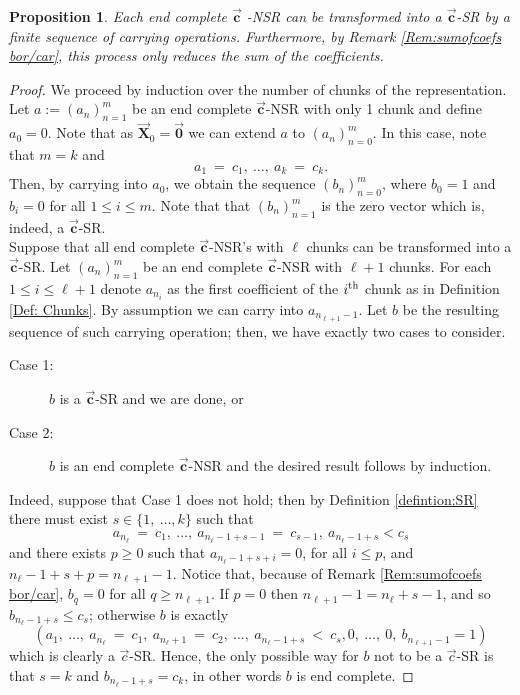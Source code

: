 \documentclass[]{interact}
\newcommand{\vtr}[1]{\vec{\mathbf{#1}}}
\theoremstyle{plain}
\numberwithin{equation}{section} %
\newtheorem{proposition}[thm]{Proposition}
\numberwithin{table}{section} %
\numberwithin{figure}{section}
\begin{document}
\begin{proposition}\label{prop:End complete}
    Each end complete $\vtr{c}$ -NSR can be transformed into a $\vtr{c}$-SR by a finite sequence of carrying operations. Furthermore, by Remark \textcolor{blue}{\ref{Rem:sumofcoefs bor/car}}, this process only reduces the sum of the coefficients.
\end{proposition}
\begin{proof}
     We proceed by induction over the number of chunks of the representation. Let $a:=(a_n)_{n=1}^m$ be an end complete $\vtr{c}$-NSR with only 1 chunk and define $a_0=0$. Note that as $\vtr{X}_0=\vtr{0}$ we can extend $a$ to $(a_n)_{n=0}^m$. In this case, note that $m = k$ and
    \[ 
      a_1\ =\ c_1 , \ \ldots ,\ a_k\ =\ c_k.
    \]
    Then, by carrying into $a_0$, we obtain the sequence $(b_n)_{n=0}^m$, where $b_0=1$ and $b_i=0$ for all $1\leq i\leq m$. Note that that $(b_n)_{n=1}^m$ is the zero vector which is, indeed, a $\vtr{c}$-SR.\\
    
    Suppose that all end complete $\vtr{c}$-NSR's with $\ell$ chunks can be transformed into a $\vtr{c}$-SR. Let $(a_n)_{n=1}^m$ be an end complete $\vtr{c}$-NSR with $\ell+1$ chunks. For each $1\leq i\leq \ell+1$ denote $a_{n_i}$ as the first coefficient of the $i^{\rm th}$ chunk as in Definition \textcolor{blue}{\ref{Def: Chunks}}. By assumption we can carry into $a_{n_{\ell+1} -1}$. Let $b$ be the resulting sequence of such carrying operation; then, we have exactly two cases to consider. 
            \begin{description}
                \item[Case 1:] $b$ is a $\vtr{c}$-SR and we are done, or\\
                
                \item[Case 2:] $b$ is an end complete $\vtr{c}$-NSR and the desired result follows by induction.
            \end{description}

             
     \noindent Indeed, suppose that Case 1 does not hold; then by Definition \textcolor{blue}{\ref{defintion:SR}} there must exist $s\in \{1, \ \ldots, k \} $ such that
     $$a_{n_\ell} \ =\ c_1, \ \ldots, \ a_{n_\ell -1 + s -1} \ = \ c_{s-1}, \  a_{n_\ell -1 + s} < c_s $$
 and there exists $p \geq 0$ such that $a_{n_\ell -1 +s + i }  = 0$, for all $i\leq p$, and $n_\ell -1 + s + p  =  n_{\ell +1}-1$. Notice that, because of Remark \textcolor{blue}{\ref{Rem:sumofcoefs bor/car}}, $ b_{q}  =  0$ for all $q\geq n_{\ell +1}$. If $p=0$ then $n_{\ell+1} - 1 = n_\ell + s-1$, and so $b_{n_\ell -1 + s} \leq c_s$; otherwise $b$ is exactly
    \[
        (a_1,\ \ldots, \ a_{n_\ell}\ =\ c_1,\ a_{n_\ell +1}\ =\ c_2,\ \ldots,\ a_{n_\ell-1  +s}\ <\ c_s, 0, \ \ldots,\ 0,\  b_{n_{\ell+1} -1} = 1)
    \]
    which is clearly a $\vec{c}$-SR.
     Hence, the only possible way for $b$ not to be a $\vec{c}$-SR is that  $s = k$ and $b_{n_\ell -1 + s} = c_k$, in other words $b$ is end complete.
\end{proof}
\end{document}

